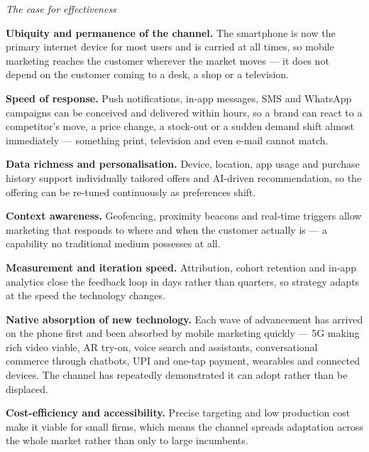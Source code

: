 \begin{qlist}
\textit{The case for effectiveness}
\begin{apts}
\item \textbf{Ubiquity and permanence of the channel.} The smartphone is now
      the primary internet device for most users and is carried at all times,
      so mobile marketing reaches the customer wherever the market moves --- it
      does not depend on the customer coming to a desk, a shop or a television.
\item \textbf{Speed of response.} Push notifications, in-app messages, SMS and
      WhatsApp campaigns can be conceived and delivered within hours, so a
      brand can react to a competitor's move, a price change, a stock-out or a
      sudden demand shift almost immediately --- something print, television
      and even e-mail cannot match.
\item \textbf{Data richness and personalisation.} Device, location, app usage
      and purchase history support individually tailored offers and
      AI-driven recommendation, so the offering can be re-tuned continuously as
      preferences shift.
\item \textbf{Context awareness.} Geofencing, proximity beacons and real-time
      triggers allow marketing that responds to where and when the customer
      actually is --- a capability no traditional medium possesses at all.
\item \textbf{Measurement and iteration speed.} Attribution, cohort retention
      and in-app analytics close the feedback loop in days rather than
      quarters, so strategy adapts at the speed the technology changes.
\item \textbf{Native absorption of new technology.} Each wave of advancement
      has arrived on the phone first and been absorbed by mobile marketing
      quickly --- 5G making rich video viable, AR try-on, voice search and
      assistants, conversational commerce through chatbots, UPI and one-tap
      payment, wearables and connected devices. The channel has repeatedly
      demonstrated it can adopt rather than be displaced.
\item \textbf{Cost-efficiency and accessibility.} Precise targeting and
      low production cost make it viable for small firms, which means the
      channel spreads adaptation across the whole market rather than only to
      large incumbents.
\end{apts}


\end{qlist}
